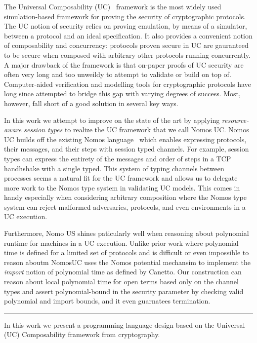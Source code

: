 The Universal Composability (UC)~\cite{uc} framework is the most widely used simulation-based framework for proving the security of cryptographic protocols. 
The UC notion of security relies on proving emulation, by means of a simulator, between a protocol and an ideal specification.
It also provides a convenient notion of composability and concurrency: protocols proven secure in UC are gauranteed to be secure when composed with arbitrary other protocols running concurrently. 
A major drawback of the framework is that on-paper proofs of UC security are often very long and too unweildy to attempt to validate or build on top of.
Computer-aided verification and modelling tools for cryptographic protocols have long since attempted to bridge this gap with varying degrees of success.
Most, however, fall short of a good solution in several key ways.

In this work we attempt to improve on the state of the art by applying \textit{resource-aware session types} to realize the UC framework that we call Nomos UC.
Nomos UC builds off the existing Nomos language~\cite{dasnomos} which enables expressing protocols, their messages, and their steps with session typed channels.
For example, session types can express the entirety of the messages and order of steps in a TCP handhshake with a single typed.
This system of typing channels between processes seems a natural fit for the UC framework and allows us to delegate more work to the Nomos type system in validating UC models.
This comes in handy especially when considering arbitrary composition where the Nomos type system can reject malformed adversaries, protocols, and even environments in a UC execution.

Furthermore, Nomo US shines paticularly well when reasoning about polynomial runtime for machines in a UC execution.
Unlike prior work where polynomial time is defined for a limited set of protocols and is difficult or even impossible to reason aboutm NomosUC uses the Nomos potential mechansim to implement the \textit{import} notion of polynomial time as defined by Canetto.
Our construction can reason about local polynomial time for open terms based only on the channel types and assert polynomial-bound in the security parameter by checking valid polynomial and import bounds, and it even guarnatees termination.



\hrule 


In this work we present a programming language design based on the Universal (UC) Composability framework from cryptography.

